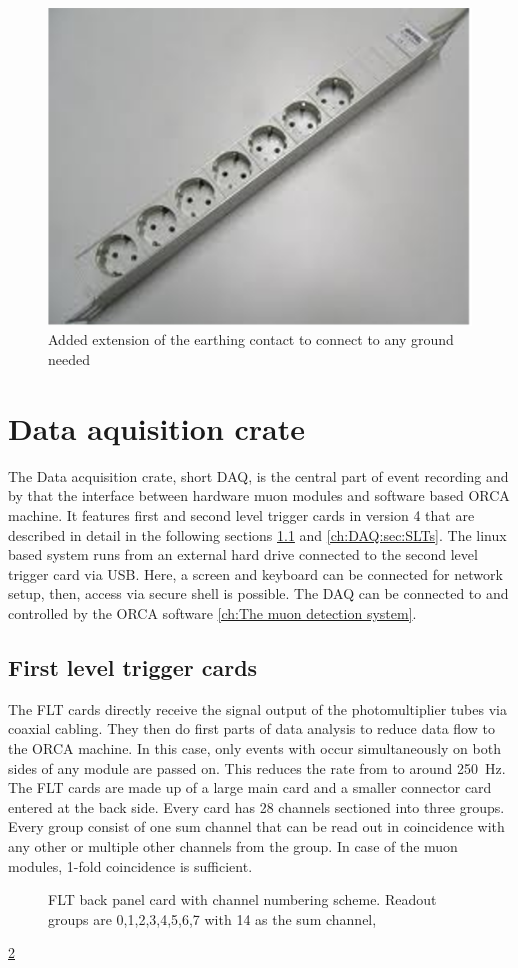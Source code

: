   \begin{figure}
  \centering
  
  	\includegraphics[width = 0.4 \textwidth]{graphics/setup/multiplug.pdf}
  \caption{Added extension of the earthing contact to connect to any ground needed}
  \label{fig:multiplug}
  \end{figure}



\section{Data aquisition crate}
\label{ch:DAQ}
The Data acquisition crate, short DAQ, is the central part of event recording and by that the interface between hardware muon modules and software based ORCA machine. It features first and second level trigger cards in version \SI{4}{} that are described in detail in the following sections \ref{ch:DAQ:sec:FLTs} and \ref{ch:DAQ:sec:SLTs}. The linux based system runs from an external hard drive connected to the second level trigger card via USB. Here, a screen and keyboard can be connected for network setup, then, access via secure shell is possible. The DAQ can be connected to and controlled by the ORCA software \ref{ch:The muon detection system}. 
  \subsection{First level trigger cards}
  \label{ch:DAQ:sec:FLTs}
  The FLT cards directly receive the signal output of the photomultiplier tubes via coaxial cabling. They then do first parts of data analysis to reduce data flow to the ORCA machine. In this case, only events with occur simultaneously on both sides of any module are passed on. This reduces the rate from  to around \SI{250}{\hertz}. The FLT cards are made up of a large main card and a smaller connector card entered at the back side. Every card has 28 channels sectioned into three groups. Every group consist of one sum channel that can be read out in coincidence with any other or multiple other channels from the group. In case of the muon modules, 1-fold coincidence is sufficient.
  \begin{figure}
	  \caption{FLT back panel card with channel numbering scheme. Readout groups are 0,1,2,3,4,5,6,7 with 14 as the sum channel,}
	  \label{fig:DAQ:FLTBack}
  \end{figure}
  \ref{fig:DAQ:FLTBack}
